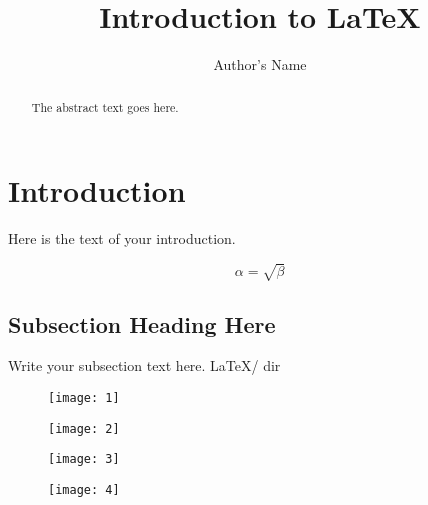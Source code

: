 \documentclass{article}
\begin{document}
	\title{Introduction to \LaTeX{}}
	\author{Author's Name}

	\maketitle

	\begin{abstract}
		The abstract text goes here.
	\end{abstract}

	\section{Introduction}
		Here is the text of your introduction.

	\begin{equation}
	    \label{simple_equation}
	    \alpha = \sqrt{ \beta }
	\end{equation}

	\subsection{Subsection Heading Here}
		Write your subsection text here.
		LaTeX/ 
		\jobname\unskip dir

	\begin{figure}
	\centering
	\texttt{[image: 1]}
	\end{figure}

	\begin{figure}
	\centering
	\texttt{[image: 2]}
	\end{figure}

	\begin{figure}
	\centering
	\texttt{[image: 3]}
	\end{figure}

	\begin{figure}
	\centering
	\texttt{[image: 4]}
	\end{figure}

	
\end{document}
